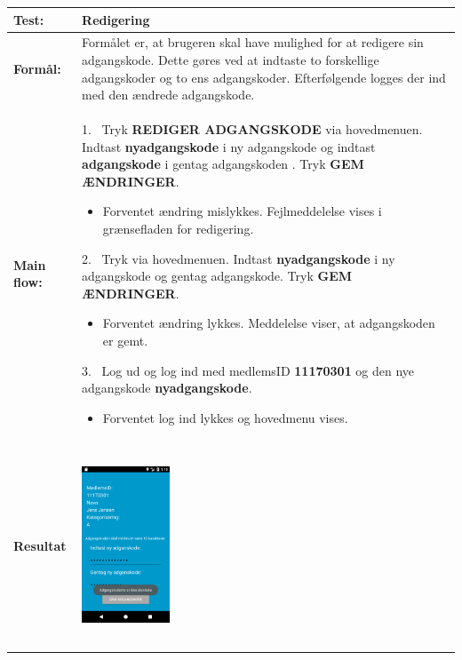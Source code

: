 \begin{table} [H]
	\centering
  \begin{tabular}{ | l | p{14cm} |} \hline
    \textbf{Test:} & Redigering \\ \hline
  \textbf{Formål:} & Formålet er, at brugeren skal have mulighed for at redigere sin adgangskode. Dette gøres ved at indtaste to forskellige adgangskoder og to ens adgangskoder. Efterfølgende logges der ind med den ændrede adgangskode.
 \\ \hline
 	\textbf{Main flow:} & 1.~ Tryk \textbf{REDIGER ADGANGSKODE} via hovedmenuen. Indtast \textbf{nyadgangskode} i ny adgangskode og indtast \textbf{adgangskode} i gentag adgangskoden . Tryk \textbf{GEM ÆNDRINGER}.   
 	\begin{itemize} [label={\checkmark}]
 	\item Forventet ændring mislykkes. Fejlmeddelelse vises i grænsefladen for redigering.
 	\end{itemize}	
 	2.~ Tryk \text{REDIGER ADGANGSKODE} via hovedmenuen. Indtast \textbf{nyadgangskode} i ny adgangskode og gentag adgangskode. Tryk \textbf{GEM ÆNDRINGER}. 
 	\begin{itemize}[label={\checkmark}]
 	\item Forventet ændring lykkes. Meddelelse viser, at adgangskoden er gemt. 
 	\end{itemize}
 	3.~ Log ud og log ind med medlemsID \textbf{11170301} og den nye adgangskode \textbf{nyadgangskode}.
 	\begin{itemize}[label={\checkmark}]
 	\item Forventet log ind lykkes og hovedmenu vises. 
	\end{itemize} \\ \hline
\textbf{Resultat} & \hspace{1.5mm}
    \raisebox{-\totalheight}    {\includegraphics[width=0.24\textwidth, height=60mm]{figures/test/redigering2}} 
      \hspace{5mm}

\end{tabular}
\end{table}
